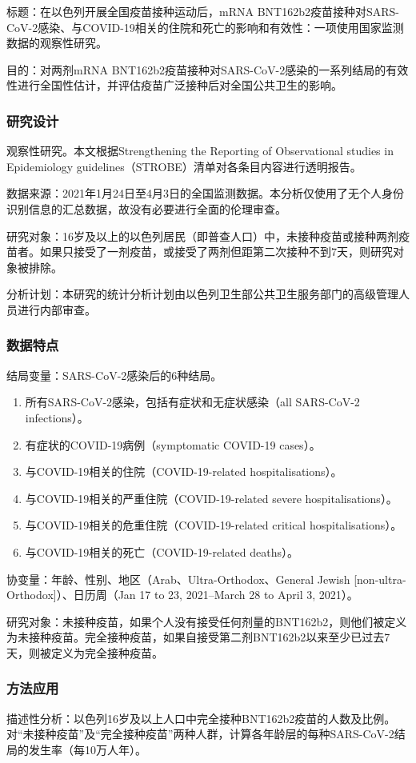 标题：在以色列开展全国疫苗接种运动后，mRNA BNT162b2疫苗接种对SARS-CoV-2感染、与COVID-19相关的住院和死亡的影响和有效性：一项使用国家监测数据的观察性研究。

目的：对两剂mRNA BNT162b2疫苗接种对SARS-CoV-2感染的一系列结局的有效性进行全国性估计，并评估疫苗广泛接种后对全国公共卫生的影响。
\subsubsection{研究设计}
观察性研究。本文根据Strengthening the Reporting of Observational studies in Epidemiology guidelines（STROBE）清单对各条目内容进行透明报告。

数据来源：2021年1月24日至4月3日的全国监测数据。本分析仅使用了无个人身份识别信息的汇总数据，故没有必要进行全面的伦理审查。

研究对象：16岁及以上的以色列居民（即普查人口）中，未接种疫苗或接种两剂疫苗者。如果只接受了一剂疫苗，或接受了两剂但距第二次接种不到7天，则研究对象被排除。

分析计划：本研究的统计分析计划由以色列卫生部公共卫生服务部门的高级管理人员进行内部审查。
\subsubsection{数据特点}
结局变量：SARS-CoV-2感染后的6种结局。
\begin{enumerate}
\item 所有SARS-CoV-2感染，包括有症状和无症状感染（all SARS-CoV-2 infections）。
\item 有症状的COVID-19病例（symptomatic COVID-19 cases）。
\item 与COVID-19相关的住院（COVID-19-related hospitalisations）。
\item 与COVID-19相关的严重住院（COVID-19-related severe hospitalisations）。
\item 与COVID-19相关的危重住院（COVID-19-related critical hospitalisations）。
\item 与COVID-19相关的死亡（COVID-19-related deaths）。
\end{enumerate}
协变量：年龄、性别、地区（Arab、Ultra-Orthodox、General Jewish [non-ultra-Orthodox]）、日历周（Jan 17 to 23, 2021--March 28 to April 3, 2021）。

研究对象：未接种疫苗，如果个人没有接受任何剂量的BNT162b2，则他们被定义为未接种疫苗。完全接种疫苗，如果自接受第二剂BNT162b2以来至少已过去7天，则被定义为完全接种疫苗。
\subsubsection{方法应用}
描述性分析：以色列16岁及以上人口中完全接种BNT162b2疫苗的人数及比例。对“未接种疫苗”及“完全接种疫苗”两种人群，计算各年龄层的每种SARS-CoV-2结局的发生率（每10万人年）。


